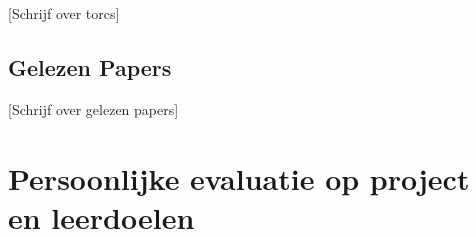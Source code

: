 \documentclass{article} %
\begin{document}
            [Schrijf over torcs]
    
        \newpage
    
        \subsection{Gelezen Papers}
        
            [Schrijf over gelezen papers]
        
        \newpage


    \section{Persoonlijke evaluatie op project en leerdoelen}


    \newpage
\end{document}
